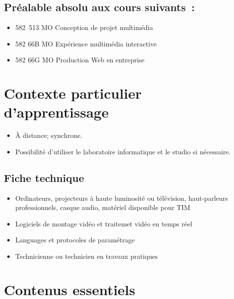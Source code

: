 \documentclass[
]{book}
\providecommand{\tightlist}{%
  \setlength{\itemsep}{0pt}\setlength{\parskip}{0pt}}
\begin{document}
\hypertarget{pruxe9alable-absolu-aux-cours-suivants}{%
\subsection{Préalable absolu aux cours suivants~:}\label{pruxe9alable-absolu-aux-cours-suivants}}

\begin{itemize}
\tightlist
\item
  582~513 MO Conception de projet multimédia
\item
  582 66B MO Expérience multimédia interactive
\item
  582 66G MO Production Web en entreprise
\end{itemize}

\hypertarget{contexte-particulier-dapprentissage}{%
\section{Contexte particulier d'apprentissage}\label{contexte-particulier-dapprentissage}}

\begin{itemize}
\tightlist
\item
  À distance; synchrone.
\item
  Possibilité d'utiliser le laboratoire informatique et le studio si nécessaire.
\end{itemize}

\hypertarget{fiche-technique}{%
\subsection{Fiche technique}\label{fiche-technique}}

\begin{itemize}
\tightlist
\item
  Ordinateurs, projecteurs à haute luminosité ou télévision, haut-parleurs professionnels, casque audio, matériel disponible pour TIM
\item
  Logiciels de montage vidéo et traitemet vidéo en temps réel
\item
  Languages et protocoles de paramétrage\\
\item
  Technicienne ou technicien en travaux pratiques
\end{itemize}

\hypertarget{contenus_essentiels}{%
\section{Contenus essentiels}\label{contenus_essentiels}}
\end{document}
